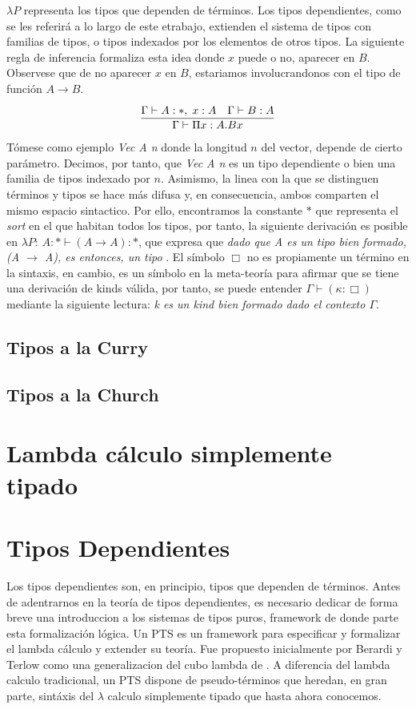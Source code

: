 \documentclass[a4paper,12pt]{report}
\theoremstyle{definition}
\theoremstyle{plain}
\theoremstyle{remark}
\begin{document}
$\lambda P$ representa los tipos que dependen de términos. Los tipos dependientes, como se les referirá a lo largo de este etrabajo, extienden el sistema de tipos con familias de tipos, o tipos indexados por los elementos de otros tipos. La siguiente regla de inferencia formaliza esta idea donde $x$ puede o no, aparecer en $B$. Observese que de no aparecer $x$ en $B$, estariamos involucrandonos con el tipo de función $A \to B$.
\begin{align}
\infer{\Gamma \vdash \Pi x : A . B x }{%
    \Gamma \vdash A : *,\; x : A
    & \deduce{\Gamma \vdash B : A}{}
  }
\end{align}
\newline
\newline
\indent Tómese como ejemplo \textit{Vec A n} donde la longitud $n$ del vector, depende de cierto parámetro. Decimos, por tanto, que \textit{Vec A n} es un tipo dependiente o bien una familia de tipos indexado por $n$. Asimismo, la linea con la que se distinguen términos y tipos se hace más difusa y, en consecuencia, ambos comparten el mismo espacio sintactico. Por ello, encontramos la constante $*$ que representa el \textit{sort} en el que habitan todos los tipos, por tanto, la siguiente derivación es posible en $\lambda P$: $A : * \vdash (A \to A) : *$, que expresa que \textit{dado que A es un tipo bien formado, (A $\to$ A), es entonces, un tipo} \citep{barendregt1991}. El símbolo $\Box$ no es propiamente un término en la sintaxis, en cambio, es un símbolo en la meta-teoría para afirmar que se tiene una derivación de kinds válida, por tanto, se puede entender $\Gamma \vdash (\kappa : \Box)$ mediante la siguiente lectura: \textit{k es un kind bien formado dado el contexto $\Gamma$}.

\subsection{Tipos a la Curry}
\subsection{Tipos a la Church} 
    \section{Lambda c\'alculo simplemente tipado}
    
    \section{Tipos Dependientes}
    Los tipos dependientes son, en principio, tipos que dependen de términos. Antes de adentrarnos en la teoría de tipos dependientes, es necesario dedicar de forma breve una introduccion a los sistemas de tipos puros, framework de donde parte esta formalización lógica. Un PTS es un framework para especificar y formalizar el lambda cálculo y extender su teoría. Fue propuesto inicialmente por Berardi y Terlow como una generalizacion del cubo lambda de \cite{cube1991}. A diferencia del lambda calculo tradicional, un PTS dispone de pseudo-términos que heredan, en gran parte, sintáxis del $\lambda$ calculo simplemente tipado que hasta ahora conocemos.
\end{document}
